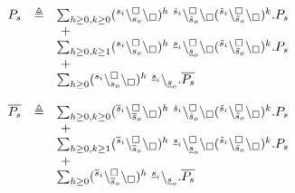 \[
\begin{array}{rcl}
 P_s & \triangleq &\sum_{h\geq 0,k\geq 0}  
  ({}^{s_i}\backslash_{s_o}^{\scriptstyle {\square}}\backslash_{\scriptstyle {\square}})^h \ {}^{\hat{s}_i}\backslash_{\hat{s}_o}^{\scriptstyle {\square}}\backslash_{\scriptstyle {\square}} ({}^{\tilde{s}_i}\backslash_{\tilde{s}_o}^{\scriptstyle {\square}}\backslash_{\scriptstyle {\square}})^k.P_s\\
&&\ + \\
&&
\sum_{h\geq 0,k\geq 1}
 ({}^{s_i}\backslash_{s_o}^{\scriptstyle {\square}}\backslash_{\scriptstyle {\square}})^h \ {}^{\underline{s}_i}\backslash_{\underline{s}_o}^{\scriptstyle {\square}}\backslash_{\scriptstyle {\square}}({}^{\tilde{s}_i}\backslash_{\tilde{s}_o}^{\scriptstyle {\square}}\backslash_{\scriptstyle {\square}})^k.P_s\\
&&\ +\\
&&\sum_{h\geq 0}({}^{s_i}\backslash_{s_o}^{\scriptstyle {\square}}\backslash_{\scriptstyle {\square}})^h \ {}^{\underline{s}_i} \backslash_{\underline{s}_o}.\overline{P_s}
\\
\\
\overline{P_s}& \triangleq &\sum_{h\geq 0,k\geq 0}  
  ({}^{\overline{s}_i}\backslash_{\overline{s}_o}^{\scriptstyle {\square}}\backslash_{\scriptstyle {\square}})^h \ {}^{\hat{s}_i}\backslash_{\hat{s}_o}^{\scriptstyle {\square}}\backslash_{\scriptstyle {\square}} ({}^{\tilde{s}_i}\backslash_{\tilde{s}_o}^{\scriptstyle {\square}}\backslash_{\scriptstyle {\square}})^k.P_s\\
&&\ + \\
&&
\sum_{h\geq 0,k\geq 1}
 ({}^{\overline{s}_i}\backslash_{\overline{s}_o}^{\scriptstyle {\square}}\backslash_{\scriptstyle {\square}})^h \ {}^{\underline{s}_i}\backslash_{\underline{s}_o}^{\scriptstyle {\square}}\backslash_{\scriptstyle {\square}}({}^{\tilde{s}_i}\backslash_{\tilde{s}_o}^{\scriptstyle {\square}}\backslash_{\scriptstyle {\square}})^k.P_s\\
&&\ +\\
&&\sum_{h\geq 0}({}^{\overline{s}_i}\backslash_{\overline{s}_o}^{\scriptstyle {\square}}\backslash_{\scriptstyle {\square}})^h \ {}^{\underline{s}_i} \backslash_{\underline{s}_o}.\overline{P_s}
\end{array}
\]

